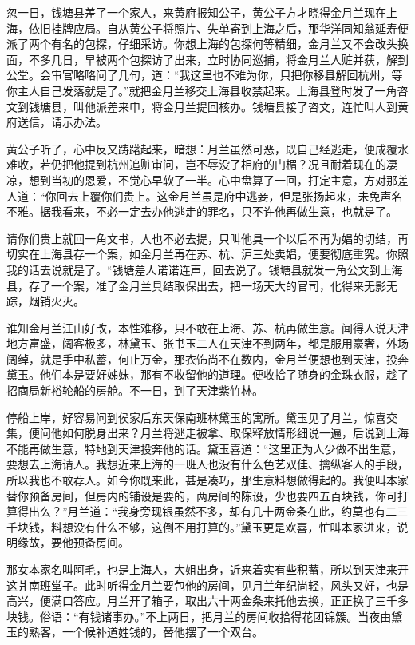 \documentclass[12pt,UTF8]{ctexbook}
\begin{document}
忽一日，钱塘县差了一个家人，来黄府报知公子，黄公子方才晓得金月兰现在上海，依旧挂牌应局。自从黄公子将照片、失单寄到上海之后，那华洋同知翁延寿便派了两个有名的包探，仔细采访。你想上海的包探何等精细，金月兰又不会改头换面，不多几日，早被两个包探访了出来，立时协同巡捕，将金月兰人赃并获，解到公堂。会审官略略问了几句，道：“我这里也不难为你，只把你移县解回杭州，等你主人自己发落就是了。”就把金月兰移交上海县收禁起来。上海县登时发了一角咨文到钱塘县，叫他派差来申，将金月兰提回核办。钱塘县接了咨文，连忙叫人到黄府送信，请示办法。

黄公子听了，心中反又踌躇起来，暗想：月兰虽然可恶，既自己经逃走，便成覆水难收，若仍把他提到杭州追赃审问，岂不辱没了相府的门楣？况且耐着现在的凄凉，想到当初的恩爱，不觉心早软了一半。心中盘算了一回，打定主意，方对那差人道：“你回去上覆你们贵上。这金月兰虽是府中逃妾，但是张扬起来，未免声名不雅。据我看来，不必一定去办他逃走的罪名，只不许他再做生意，也就是了。

请你们贵上就回一角文书，人也不必去提，只叫他具一个以后不再为娼的切结，再切实在上海县存一个案，如金月兰再在苏、杭、沪三处卖娼，便要彻底重究。你照我的话去说就是了。“钱塘差人诺诺连声，回去说了。钱塘县就发一角公文到上海县，存了一个案，准了金月兰具结取保出去，把一场天大的官司，化得来无影无踪，烟销火灭。

谁知金月兰江山好改，本性难移，只不敢在上海、苏、杭再做生意。闻得人说天津地方富盛，阔客极多，林黛玉、张书玉二人在天津不到两年，都是服用豪奢，外场阔绰，就是手中私蓄，何止万金，那衣饰尚不在数内，金月兰便想也到天津，投奔黛玉。他们本是要好姊妹，那有不收留他的道理。便收拾了随身的金珠衣服，趁了招商局新裕轮船的房舱。不一日，到了天津紫竹林。

停船上岸，好容易问到侯家后东天保南班林黛玉的寓所。黛玉见了月兰，惊喜交集，便问他如何脱身出来？月兰将逃走被拿、取保释放情形细说一遍，后说到上海不能再做生意，特地到天津投奔他的话。黛玉喜道：“这里正为人少做不出生意，要想去上海请人。我想近来上海的一班人也没有什么色艺双佳、擒纵客人的手段，所以我也不敢荐人。如今你既来此，甚是凑巧，那生意料想做得起的。我便叫本家替你预备房间，但房内的铺设是要的，两房间的陈设，少也要四五百块钱，你可打算得出么？”月兰道：“我身旁现银虽然不多，却有几十两金条在此，约莫也有二三千块钱，料想没有什么不够，这倒不用打算的。”黛玉更是欢喜，忙叫本家进来，说明缘故，要他预备房间。

那女本家名叫阿毛，也是上海人，大姐出身，近来着实有些积蓄，所以到天津来开这爿南班堂子。此时听得金月兰要包他的房间，见月兰年纪尚轻，风头又好，也是高兴，便满口答应。月兰开了箱子，取出六十两金条来托他去换，正正换了三千多块钱。俗语：“有钱诸事办。”不上两日，把月兰的房间收拾得花团锦簇。当夜由黛玉的熟客，一个候补道姓钱的，替他摆了一个双台。
\end{document}
